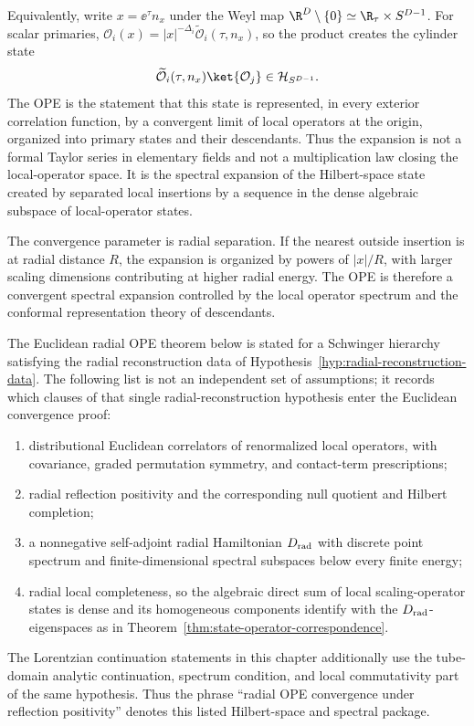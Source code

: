 Equivalently, write \(x=\ee^\tau n_x\) under the Weyl map
\(\R^D\setminus\{0\}\simeq\R_\tau\times S^{D-1}\).  For scalar primaries,
\(\mathcal O_i(x)=|x|^{-\Delta_i}\widetilde{\mathcal O}_i(\tau,n_x)\),
so the product creates the cylinder state
\[
  \widetilde{\mathcal O}_i(\tau,n_x)\ket{\mathcal O_j}
  \in\mathcal H_{S^{D-1}}.
\]
The OPE is the statement that this state is represented, in every exterior
correlation function, by a convergent limit of local operators at the origin,
organized into primary states and their descendants.  Thus the expansion is
not a formal Taylor series in elementary fields and not a multiplication law
closing the local-operator space.  It is the spectral expansion of the
Hilbert-space state created by separated local insertions by a sequence in
the dense algebraic subspace of local-operator states.

The convergence parameter is radial separation.  If the nearest outside
insertion is at radial distance \(R\), the expansion is organized by powers of
\(|x|/R\), with larger scaling dimensions contributing at higher radial
energy.  The OPE is therefore a convergent spectral expansion controlled by
the local operator spectrum and the conformal representation theory of
descendants.

\begin{definition}
\label{def:radial-ope-convergence-hypotheses}
The Euclidean radial OPE theorem below is stated for a Schwinger hierarchy
satisfying the radial reconstruction data of
Hypothesis~\ref{hyp:radial-reconstruction-data}.  The following list is not an
independent set of assumptions; it records which clauses of that single
radial-reconstruction hypothesis enter the Euclidean convergence proof:
\begin{enumerate}
  \item distributional Euclidean correlators of renormalized local operators,
  with covariance, graded permutation symmetry, and contact-term
  prescriptions;
  \item radial reflection positivity and the corresponding null quotient and
  Hilbert completion;
  \item a nonnegative self-adjoint radial Hamiltonian \(D_{\rm rad}\) with
  discrete point spectrum and finite-dimensional spectral subspaces below
  every finite energy;
  \item radial local completeness, so the algebraic direct sum of local
  scaling-operator states is dense and its homogeneous components identify
  with the \(D_{\rm rad}\)-eigenspaces as in
  Theorem~\ref{thm:state-operator-correspondence}.
\end{enumerate}
The Lorentzian continuation statements in this chapter additionally use the
tube-domain analytic continuation, spectrum condition, and local
commutativity part of the same hypothesis.  Thus the phrase
``radial OPE convergence under reflection positivity'' denotes this listed
Hilbert-space and spectral package.
\end{definition}


